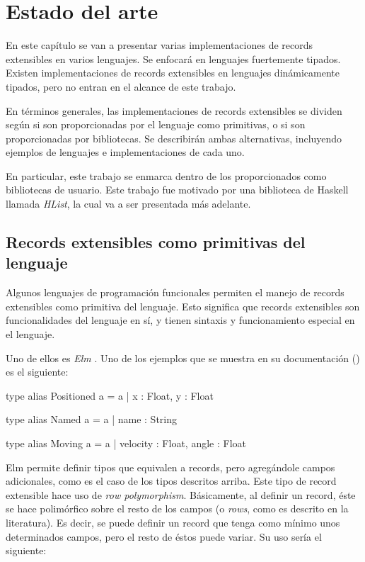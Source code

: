 
\chapter{Estado del arte}
\label{ch:2}
En este capítulo se van a presentar varias implementaciones de records extensibles en varios lenguajes. Se enfocará en lenguajes fuertemente tipados. Existen implementaciones de records extensibles en lenguajes dinámicamente tipados, pero no entran en el alcance de este trabajo.

En términos generales, las implementaciones de records extensibles se dividen según si son proporcionadas por el lenguaje como primitivas, o si son proporcionadas por bibliotecas. Se describirán ambas alternativas, incluyendo ejemplos de lenguajes e implementaciones de cada uno.

En particular, este trabajo se enmarca dentro de los proporcionados como bibliotecas de usuario. Este trabajo fue motivado por una biblioteca de Haskell llamada \textit{HList}, la cual va a ser presentada más adelante.

\section{Records extensibles como primitivas del lenguaje}

Algunos lenguajes de programación funcionales permiten el manejo de records extensibles como primitiva del lenguaje. Esto significa que records extensibles son funcionalidades del lenguaje en sí, y tienen sintaxis y funcionamiento especial en el lenguaje.

Uno de ellos es \textit{Elm} \cite{Czaplicki:2013:AFR:2499370.2462161}. Uno de los ejemplos que se muestra en su documentación (\cite{ElmRecords}) es el siguiente:

\begin{code}
type alias Positioned a =
  { a | x : Float, y : Float }

type alias Named a =
  { a | name : String }

type alias Moving a =
  { a | velocity : Float, angle : Float }
\end{code}

Elm permite definir tipos que equivalen a records, pero agregándole campos adicionales, como es el caso de los tipos descritos arriba. Este tipo de record extensible hace uso de \textit{row polymorphism}. Básicamente, al definir un record, éste se hace polimórfico sobre el resto de los campos (o \textit{rows}, como es descrito en la literatura). Es decir, se puede definir un record que tenga como mínimo unos determinados campos, pero el resto de éstos puede variar. Su uso sería el siguiente:

